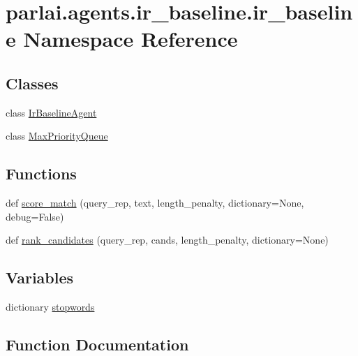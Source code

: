\hypertarget{namespaceparlai_1_1agents_1_1ir__baseline_1_1ir__baseline}{}\section{parlai.\+agents.\+ir\+\_\+baseline.\+ir\+\_\+baseline Namespace Reference}
\label{namespaceparlai_1_1agents_1_1ir__baseline_1_1ir__baseline}
\subsection*{Classes}
\begin{DoxyCompactItemize}
\item 
class \hyperlink{classparlai_1_1agents_1_1ir__baseline_1_1ir__baseline_1_1IrBaselineAgent}{Ir\+Baseline\+Agent}
\item 
class \hyperlink{classparlai_1_1agents_1_1ir__baseline_1_1ir__baseline_1_1MaxPriorityQueue}{Max\+Priority\+Queue}
\end{DoxyCompactItemize}
\subsection*{Functions}
\begin{DoxyCompactItemize}
\item 
def \hyperlink{namespaceparlai_1_1agents_1_1ir__baseline_1_1ir__baseline_a64aaaccb38f5dd5f51c09439456b2f6e}{score\+\_\+match} (query\+\_\+rep, text, length\+\_\+penalty, dictionary=None, debug=False)
\item 
def \hyperlink{namespaceparlai_1_1agents_1_1ir__baseline_1_1ir__baseline_a995475fdd96a7bbd8886a3ebcfa56156}{rank\+\_\+candidates} (query\+\_\+rep, cands, length\+\_\+penalty, dictionary=None)
\end{DoxyCompactItemize}
\subsection*{Variables}
\begin{DoxyCompactItemize}
\item 
dictionary \hyperlink{namespaceparlai_1_1agents_1_1ir__baseline_1_1ir__baseline_ad39f034177c71e873eeedb1cc2d24e52}{stopwords}
\end{DoxyCompactItemize}


\subsection{Function Documentation}
\mbox{\label{namespaceparlai_1_1agents_1_1ir__baseline_1_1ir__baseline_a995475fdd96a7bbd8886a3ebcfa56156}} 
